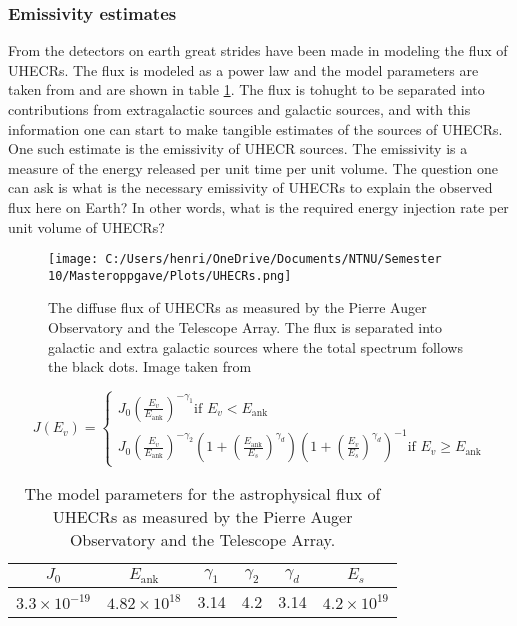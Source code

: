 \subsubsection{Emissivity estimates}
\label{sec:emmisivity}
From the detectors on earth great strides have been made in modeling the flux of UHECRs. The flux is modeled as a power law and the model parameters are taken from \cite{thepierreaugercollaboration2017pierre} and are shown in table \ref{tab:UHECR_flux}. The flux is tohught to be separated into contributions from extragalactic sources and galactic sources, and with this information one can start to make tangible estimates of the sources of UHECRs.
One such estimate is the emissivity of UHECR sources. The emissivity is a measure of the energy released per unit time per unit volume. The question one can ask is what is the necessary emissivity of UHECRs to explain the observed flux here on Earth? In other words, what is the required energy injection rate per unit volume of UHECRs?


\begin{figure}
    \centering
    \texttt{[image: C:/Users/henri/OneDrive/Documents/NTNU/Semester 10/Masteroppgave/Plots/UHECRs.png]}
    \caption{The diffuse flux of UHECRs as measured by the Pierre Auger Observatory and the Telescope Array. The flux is separated into galactic and extra galactic sources where the total spectrum follows the black dots. Image taken from \cite{Abdul_Halim_2023}}
    \label{fig:flux_UHECRs}
\end{figure}



\begin{equation}
    J(E_v) = \begin{cases} 
        J_0 \left(\frac{E_v}{E_{\text{ank}}}\right)^{-\gamma_1}  \text{if } E_v < E_{\text{ank}} \\
        J_0 \left(\frac{E_v}{E_{\text{ank}}}\right)^{-\gamma_2} \left(1 + \left(\frac{E_{\text{ank}}}{E_s}\right)^{\gamma_d}\right) \left(1 + \left(\frac{E_v}{E_s}\right)^{\gamma_d}\right)^{-1}   \text{if } E_v \geq E_{\text{ank}}
    \end{cases}
\end{equation}

\begin{table}
    \centering
    \begin{tabular}{|c|c|c|c|c|c|}
        \hline
        $J_0$ & $E_{\text{ank}}$ & $\gamma_1$ & $\gamma_2$ &$\gamma_d$& $E_s$\\
        \hline
        $3.3 \times 10^{-19} $ & $4.82\times 10^{18}$ & 3.14  & 4.2 & 3.14& $4.2 \times 10^{19}$  \\
        \hline
    \end{tabular}
    \caption{The model parameters for the astrophysical flux of UHECRs as measured by the Pierre Auger Observatory and the Telescope Array.}
    \label{tab:UHECR_flux}
\end{table}




